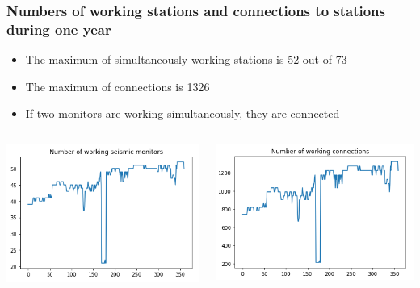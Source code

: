 \documentclass{beamer}
\begin{document}
\begin{frame}
\frametitle{Numbers of working stations and connections to stations during one year}
\begin{itemize}
\item The maximum of simultaneously working stations is 52 out of 73
\item The maximum of connections is 1326
\item If two monitors are working simultaneously, they are connected
\end{itemize}

\begin{columns}
\includegraphics[width=\textwidth]{working_monitors.png}

\includegraphics[width=\textwidth]{working_connections.png}
\end{columns}
\end{frame}
\end{document}

